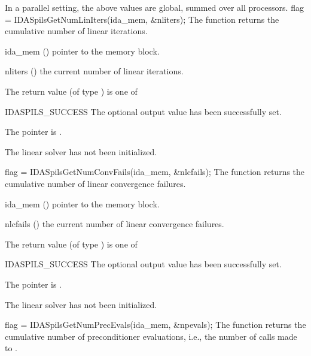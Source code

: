 {{  In a parallel setting, the above values are global, summed over all processors.
}
{
  flag = IDASpilsGetNumLinIters(ida\_mem, \&nliters);
}
{
  The function  returns the
  cumulative number of linear iterations.
}
{
  \begin{args}[nliters]
  \item[ida\_mem] ()
    pointer to the {\idas} memory block.
  \item[nliters] ()
    the current number of linear iterations.
  \end{args}
}
{
  The return value  (of type ) is one of
  \begin{args}
  \item[IDASPILS\_SUCCESS] 
    The optional output value has been successfully set.
  \item[\Id{IDASPILS\_MEM\_NULL}]
    The  pointer is .
  \item[\Id{IDASPILS\_LMEM\_NULL}]
    The {\idaspils} linear solver has not been initialized.
  \end{args}
}
{}
{
  flag = IDASpilsGetNumConvFails(ida\_mem, \&nlcfails);
}
{
  The function  returns the
  cumulative number of linear convergence failures.
}
{
  \begin{args}[nlcfails]
  \item[ida\_mem] ()
    pointer to the {\idas} memory block.
  \item[nlcfails] ()
    the current number of linear convergence failures.
  \end{args}
}
{
  The return value  (of type ) is one of
  \begin{args}
  \item[IDASPILS\_SUCCESS] 
    The optional output value has been successfully set.
  \item[\Id{IDASPILS\_MEM\_NULL}]
    The  pointer is .
  \item[\Id{IDASPILS\_LMEM\_NULL}]
    The {\idaspils} linear solver has not been initialized.
  \end{args}
}
{}
{
  flag = IDASpilsGetNumPrecEvals(ida\_mem, \&npevals);
}
{
  The function  returns the
  cumulative number of preconditioner evaluations, i.e., the number of 
  calls made to .
}}
